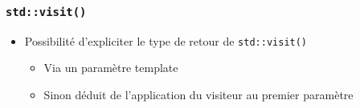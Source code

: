 \documentclass[C++.tex]{subfiles}
\begin{document}
\begin{frame}[fragile]
	\frametitle{\lstinline|std::visit()|}
	\begin{itemize}
		\item Possibilité d'expliciter le type de retour de \lstinline|std::visit()|
		\begin{itemize}
			\item Via un paramètre template
			\item Sinon déduit de l'application du visiteur au premier paramètre
		\end{itemize}
	\end{itemize}
\end{frame}
\end{document}
